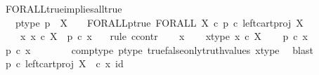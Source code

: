 \begin{isabellebody}
\isamarkupfalse%
%
\endisatagproof
{\isafoldproof}%
%
\isadelimproof
\isanewline
%
\endisadelimproof
\isanewline
{}\isamarkupfalse%
\ FORALL{\isacharunderscore}{\kern0pt}true{\isacharunderscore}{\kern0pt}implies{\isacharunderscore}{\kern0pt}all{\isacharunderscore}{\kern0pt}true{\isacharcolon}{\kern0pt}\isanewline
\ \ \ p{\isacharunderscore}{\kern0pt}type{\isacharcolon}{\kern0pt}\ {\isachardoublequoteopen}p\ {\isacharcolon}{\kern0pt}\ X\ {\isasymrightarrow}\ {\isasymOmega}{\isachardoublequoteclose}\ \ FORALL{\isacharunderscore}{\kern0pt}p{\isacharunderscore}{\kern0pt}true{\isacharcolon}{\kern0pt}\ {\isachardoublequoteopen}FORALL\ X\ {\isasymcirc}\isactrlsub c\ {\isacharparenleft}{\kern0pt}p\ {\isasymcirc}\isactrlsub c\ left{\isacharunderscore}{\kern0pt}cart{\isacharunderscore}{\kern0pt}proj\ X\ {\isasymone}{\isacharparenright}{\kern0pt}\isactrlsup {\isasymsharp}\ {\isacharequal}{\kern0pt}\ {\isasymt}{\isachardoublequoteclose}\isanewline
\ \ \ {\isachardoublequoteopen}{\isasymAnd}\ x{\isachardot}{\kern0pt}\ x\ {\isasymin}\isactrlsub c\ X\ {\isasymLongrightarrow}\ p\ {\isasymcirc}\isactrlsub c\ x\ {\isacharequal}{\kern0pt}\ {\isasymt}{\isachardoublequoteclose}\isanewline
%
\isadelimproof
%
\endisadelimproof
%
\isatagproof
{}\isamarkupfalse%
\ {\isacharparenleft}{\kern0pt}rule\ ccontr{\isacharparenright}{\kern0pt}\isanewline
\ \ \isamarkupfalse%
\ x\isanewline
\ \ \isamarkupfalse%
\ x{\isacharunderscore}{\kern0pt}type{\isacharcolon}{\kern0pt}\ {\isachardoublequoteopen}x\ {\isasymin}\isactrlsub c\ X{\isachardoublequoteclose}\isanewline
\ \ \isamarkupfalse%
\ {\isachardoublequoteopen}p\ {\isasymcirc}\isactrlsub c\ x\ {\isasymnoteq}\ {\isasymt}{\isachardoublequoteclose}\isanewline
\ \ \isamarkupfalse%
\ \isamarkupfalse%
\ {\isachardoublequoteopen}p\ {\isasymcirc}\isactrlsub c\ x\ {\isacharequal}{\kern0pt}\ {\isasymf}{\isachardoublequoteclose}\isanewline
\ \ \ \ \isamarkupfalse%
\ comp{\isacharunderscore}{\kern0pt}type\ p{\isacharunderscore}{\kern0pt}type\ true{\isacharunderscore}{\kern0pt}false{\isacharunderscore}{\kern0pt}only{\isacharunderscore}{\kern0pt}truth{\isacharunderscore}{\kern0pt}values\ x{\isacharunderscore}{\kern0pt}type\ \isamarkupfalse%
\ blast\isanewline
\ \ \isamarkupfalse%
\ \isamarkupfalse%
\ {\isachardoublequoteopen}p\ {\isasymcirc}\isactrlsub c\ left{\isacharunderscore}{\kern0pt}cart{\isacharunderscore}{\kern0pt}proj\ X\ {\isasymone}\ {\isasymcirc}\isactrlsub c\ {\isasymlangle}x{\isacharcomma}{\kern0pt}\ id\ {\isasymone}{\isasymrangle}\ {\isacharequal}{\kern0pt}\ {\isasymf}{\isachardoublequoteclose}\isanewline

\end{isabellebody}
